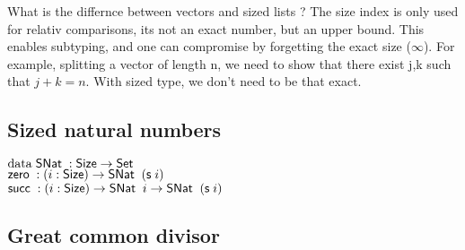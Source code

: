 What is the differnce between vectors and sized lists ?
The size index is only used for relativ comparisons, its not an exact number, but an upper bound.
This enables subtyping, and one can compromise by forgetting the exact size ($\infty$).
For example, splitting a vector of length n, we need to show that there exist j,k such that $j+k = n$.
With sized type, we don't need to be that exact.
\subsection{Sized natural numbers}
\begin{bsp}
$\mathrm{data}\; \mathsf{SNat}\; : \mathsf{Size} \rightarrow \mathsf{Set} $ \\
$\mathsf{zero}\; : ( i : \mathsf{Size} ) \rightarrow{ \mathsf{SNat}\;\; (\mathsf{s}\;i)} $\\
$\mathsf{succ}\; : ( i : \mathsf{Size} ) \rightarrow{ \mathsf{SNat}\;\; i \rightarrow\mathsf{SNat}\;\; (\mathsf{s}\;i)} $
\end{bsp}

\subsection{Great common divisor}


